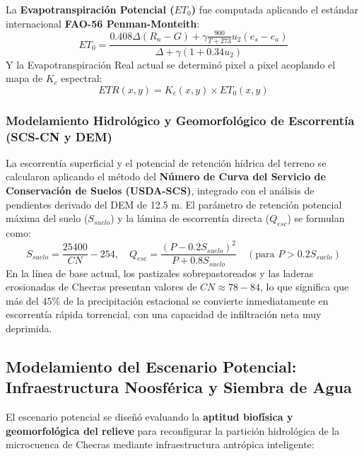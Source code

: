 \documentclass[11pt,a4paper]{article}
\begin{document}
La \textbf{Evapotranspiración Potencial ($ET_0$)} fue computada aplicando el estándar internacional \textbf{FAO-56 Penman-Monteith}:
\begin{equation}
ET_0 = \frac{0.408 \Delta (R_n - G) + \gamma \frac{900}{T + 273} u_2 (e_s - e_a)}{\Delta + \gamma (1 + 0.34 u_2)}
\end{equation}
Y la Evapotranspiración Real actual se determinó pixel a pixel acoplando el mapa de $K_c$ espectral:
\begin{equation}
ETR(x,y) = K_c(x,y) \times ET_0(x,y)
\end{equation}

\subsubsection{Modelamiento Hidrológico y Geomorfológico de Escorrentía (SCS-CN y DEM)}
La escorrentía superficial y el potencial de retención hídrica del terreno se calcularon aplicando el método del \textbf{Número de Curva del Servicio de Conservación de Suelos (USDA-SCS)}, integrado con el análisis de pendientes derivado del DEM de 12.5 m. El parámetro de retención potencial máxima del suelo ($S_{suelo}$) y la lámina de escorrentía directa ($Q_{esc}$) se formulan como:
\begin{equation}
S_{suelo} = \frac{25400}{CN} - 254, \quad Q_{esc} = \frac{(P - 0.2 S_{suelo})^2}{P + 0.8 S_{suelo}} \quad (\text{para } P > 0.2 S_{suelo})
\end{equation}
En la línea de base actual, los pastizales sobrepastoreados y las laderas erosionadas de Checras presentan valores de $CN \approx 78 - 84$, lo que significa que más del $45\%$ de la precipitación estacional se convierte inmediatamente en escorrentía rápida torrencial, con una capacidad de infiltración neta muy deprimida.

\subsection{Modelamiento del Escenario Potencial: Infraestructura Noosférica y Siembra de Agua}
El escenario potencial se diseñó evaluando la \textbf{aptitud biofísica y geomorfológica del relieve} para reconfigurar la partición hidrológica de la microcuenca de Checras mediante infraestructura antrópica inteligente:
\end{document}
